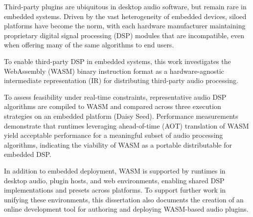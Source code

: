 Third-party plugins are ubiquitous in desktop audio software, but remain
rare in embedded systems. Driven by the vast heterogeneity of embedded
devices, siloed platforms have become the norm, with each hardware
manufacturer maintaining proprietary digital signal processing (DSP)
modules that are incompatible, even when offering many of the same
algorithms to end users.

To enable third-party DSP in embedded systems, this work investigates the
WebAssembly (WASM) binary instruction format as a hardware-agnostic
intermediate representation (IR) for distributing third-party audio
processing.

To assess feasibility under real-time constraints, representative audio DSP
algorithms are compiled to WASM and compared across three execution
strategies on an embedded platform (Daisy Seed). Performance measurements
demonstrate that runtimes leveraging ahead-of-time (AOT) translation of
WASM yield acceptable performance for a meaningful subset of audio
processing algorithms, indicating the viability of WASM as a portable
distributable for embedded DSP.

In addition to embedded deployment, WASM is supported by runtimes in
desktop audio, plugin hosts, and web environments, enabling shared DSP
implementations and presets across platforms. To support further work in
unifying these environments, this dissertation also documents the creation
of an online development tool for authoring and deploying WASM-based audio
plugins.
